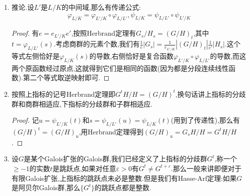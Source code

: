 \begin{enumerate}
\begin{proof}
		\qquad
		
		最后证明我们的断言.记$m=i_{L/K}(\sigma)$,设$\tau\in H_{m-1}=G_{m-1}(L/L')=G_{m-1}(L/K)\cap H$,于是$i_{L/K}(\tau)\ge m$.另外按照$\sigma\tau(\Pi)-\Pi=\left(\sigma\tau(\Pi)-\sigma(\Pi)\right)+\left(\sigma(\Pi)-\Pi\right)$,前一个括号的赋值$\ge m$(因为是一个赋值$\ge m$的元的共轭元),后一个赋值就是$m$,于是它们的和的赋值$\ge m$.但是我们选取的$\sigma$是$\sigma'$的提升在$i$函数下取最大值的,于是这只能得到$i_{L/K}(\sigma\tau)=m$.再设$\tau\not\in H_{m-1}$,那么$i_{L/K}(\tau)<m$,于是有$i_{L/K}(\sigma\tau)=i_{L/K}(\tau)<m$.整理得$i_{L/K}(\sigma\tau)=\min\{m,i_{L/K}(\tau)\}$,其中$\tau\in H$.于是得到$i_{L'/K}(\sigma')=\frac{1}{e'}\sum_{\tau\in H}\min\{m,i_{L/K}(\tau)\}$.
		
		现在$\varphi_{L/L'}(i_{L/K}(\sigma)-1)=\frac{1}{g_0(L/L')}\sum_{\tau\in H}\min\{i_{L/K}(\tau),m\}-1$.这里$g_0(L/L')=e'$,于是结合上段最后等式得到$i_{L'/K}(\sigma')-1=\varphi_{L/L'}(i_{L/K}(\sigma)-1)$.
	\end{proof}
	\item 推论.设$L'$是$L/K$的中间域,那么有传递公式:
	$$\varphi_{L/K}=\varphi_{L'/K}\circ\varphi_{L/L'},\psi_{L/K}=\psi_{L/L'}\circ\psi_{L'/K}$$
	\begin{proof}
		
		有$e=e_{L'/K}e'$,按照Herbrand定理有$G_s/H_s=(G/H)_t$,其中$t=\varphi_{L/L'}(s)$.考虑商群的元素个数,我们有$\frac{1}{e}|G_s|=\frac{1}{e_{L'/K}}|(G/H)_t|\frac{1}{e'}|H_s|$.这个等式左侧恰好是$\varphi_{L/K}(s)$的导数,右侧恰好是复合函数$\varphi_{L'/K}\circ\varphi_{L/L'}$的导数,而这两个原函数经过原点,这就得到它们是相同的函数(因为都是分段连续线性函数).第二个等式取逆映射即可.
	\end{proof}
	\item 按照上指标的记号Herbrand定理即$G^tH/H=(G/H)^t$,换句话讲上指标的分歧群和商群相适应,下指标的分歧群和子群相适应.
	\begin{proof}
		
		记$u=\psi_{L'/K}(t)$和$s=\psi_{L/L'}(u)=\psi_{L/K}(t)$(用到了传递性),那么有$(G/H)^t=(G/H)_u$,用Herbrand定理得到$(G/H)_u=G_sH/H=G^tH/H$.
	\end{proof}
    \item 设$G$是某个Galois扩张的Galois群,我们已经定义了上指标的分歧群$G^t$,称一个$\ge-1$的实数$t$是跳跃点,如果对任意$\varepsilon>0$有$G^t\not=G^{t+\varepsilon}$.那么一般来讲即便对于有限Galois扩张,上指标的跳跃点未必是整数.但是我们有Hasse-Arf定理:如果$G$是阿贝尔Galois群,那么$\{G^t\}$的跳跃点都是整数.
\end{enumerate}

